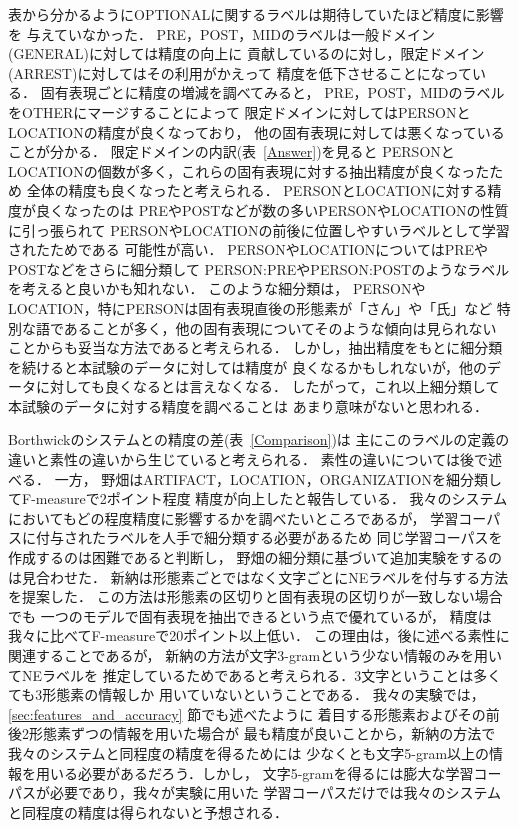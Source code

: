 表から分かるようにOPTIONALに関するラベルは期待していたほど精度に影響を
与えていなかった．
PRE，POST，MIDのラベルは一般ドメイン(GENERAL)に対しては精度の向上に
貢献しているのに対し，限定ドメイン(ARREST)に対してはその利用がかえって
精度を低下させることになっている．
固有表現ごとに精度の増減を調べてみると，
PRE，POST，MIDのラベルをOTHERにマージすることによって
限定ドメインに対してはPERSONとLOCATIONの精度が良くなっており，
他の固有表現に対しては悪くなっていることが分かる．
限定ドメインの内訳(表~\ref{Answer})を見ると
PERSONとLOCATIONの個数が多く，これらの固有表現に対する抽出精度が良くなったため
全体の精度も良くなったと考えられる．
PERSONとLOCATIONに対する精度が良くなったのは
PREやPOSTなどが数の多いPERSONやLOCATIONの性質に引っ張られて
PERSONやLOCATIONの前後に位置しやすいラベルとして学習されたためである
可能性が高い．
PERSONやLOCATIONについてはPREやPOSTなどをさらに細分類して
PERSON:PREやPERSON:POSTのようなラベルを考えると良いかも知れない．
このような細分類は，
PERSONやLOCATION，特にPERSONは固有表現直後の形態素が「さん」や「氏」など
特別な語であることが多く，他の固有表現についてそのような傾向は見られない
\cite{nova_irex2:99}ことからも妥当な方法であると考えられる．
しかし，抽出精度をもとに細分類を続けると本試験のデータに対しては精度が
良くなるかもしれないが，他のデータに対しても良くなるとは言えなくなる．
したがって，これ以上細分類して本試験のデータに対する精度を調べることは
あまり意味がないと思われる．

Borthwickのシステムとの精度の差(表~\ref{Comparison})は
主にこのラベルの定義の違いと素性の違いから生じていると考えられる．
素性の違いについては後で述べる．
一方，
野畑はARTIFACT，LOCATION，ORGANIZATIONを細分類してF-measureで2ポイント程度
精度が向上したと報告している．
我々のシステムにおいてもどの程度精度に影響するかを調べたいところであるが，
学習コーパスに付与されたラベルを人手で細分類する必要があるため
同じ学習コーパスを作成するのは困難であると判断し，
野畑の細分類に基づいて追加実験をするのは見合わせた．
新納は形態素ごとではなく文字ごとにNEラベルを付与する方法を提案した．
この方法は形態素の区切りと固有表現の区切りが一致しない場合でも
一つのモデルで固有表現を抽出できるという点で優れているが，
精度は我々に比べてF-measureで20ポイント以上低い．
この理由は，後に述べる素性に関連することであるが，
新納の方法が文字3-gramという少ない情報のみを用いてNEラベルを
推定しているためであると考えられる．3文字ということは多くても3形態素の情報しか
用いていないということである．
我々の実験では，\ref{sec:features_and_accuracy} 節でも述べたように
着目する形態素およびその前後2形態素ずつの情報を用いた場合が
最も精度が良いことから，新納の方法で我々のシステムと同程度の精度を得るためには
少なくとも文字5-gram以上の情報を用いる必要があるだろう．しかし，
文字5-gramを得るには膨大な学習コーパスが必要であり，我々が実験に用いた
学習コーパスだけでは我々のシステムと同程度の精度は得られないと予想される．


